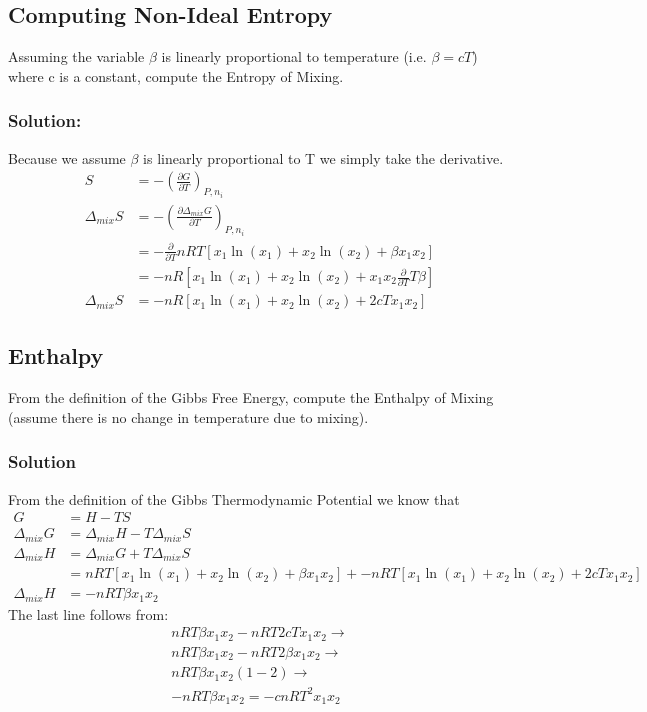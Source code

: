 \documentclass{article}
\newcommand{\be}{\begin{equation}}
\newcommand{\ee}{\end{equation}}
\newcommand{\pd}{\partial}
\begin{document}
\subsection{Computing Non-Ideal Entropy}
Assuming the variable $\beta$ is linearly proportional to temperature (i.e. $\beta=cT$) where c is a constant, compute the Entropy of Mixing. 

\subsubsection*{Solution:}
Because we assume $\beta$ is linearly proportional to T we simply take the derivative.
\be
\begin{split}
S &= -\left(\frac{\pd G}{\pd T}\right)_{P,n_i}\\
\Delta_{mix}S &= - \left(\frac{\pd \Delta_{mix}G}{\pd T}\right)_{P,n_i}\\
&= - \frac{\pd}{\pd T} nRT\left[x_1\ln(x_1) + x_2\ln(x_2) + \beta x_1x_2\right] \\
&= -nR\left[x_1\ln(x_1) + x_2\ln(x_2) + x_1x_2\frac{\pd}{\pd T}T\beta \right]\\
\Delta_{mix}S &= -nR\left[x_1\ln(x_1) + x_2\ln(x_2) + 2cTx_1x_2 \right]
\end{split}
\ee

\subsection{Enthalpy}
From the definition of the Gibbs Free Energy, compute the Enthalpy of Mixing (assume there is no change in temperature due to mixing). 

\subsubsection*{Solution}
From the definition of the Gibbs Thermodynamic Potential we know that
\be
\begin{split}
G &= H - TS\\
\Delta_{mix}G &= \Delta_{mix}H - T\Delta_{mix}S\\
\Delta_{mix}H &= \Delta_{mix}G + T\Delta_{mix}S\\
&= nRT\left[x_1\ln(x_1) + x_2\ln(x_2) + \beta x_1x_2\right] + -nRT\left[x_1\ln(x_1) + x_2\ln(x_2) + 2cTx_1x_2 \right]\\
\Delta_{mix}H &= -nRT\beta x_1x_2
\end{split}
\ee
The last line follows from:
\be
\begin{split}
nRT\beta x_1x_2 - nRT2cTx_1x_2 \rightarrow\\
nRT\beta x_1x_2 - nRT2\beta x_1x_2 \rightarrow \\
nRT\beta x_1x_2(1-2) \rightarrow \\
-nRT\beta x_1x_2 = -cnRT^2x_1x_2
\end{split}
\ee
\end{document}
